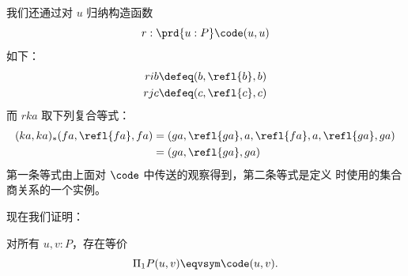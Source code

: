 我们还通过对 $u$ 归纳构造函数
\[ r : \prd{u:P} \code(u,u) \]
如下：
\begin{align*}
  rib &\defeq (b,\refl{b},b)\\
  rjc &\defeq (c,\refl{c},c)
\end{align*}
而 $rka$ 取下列复合等式：
\begin{align*}
  (ka,ka)_* (fa,\refl{fa},fa)
  &= (ga,\refl{ga},a,\refl{fa},a,\refl{ga},ga) \\
  &= (ga,\refl{ga},ga)
\end{align*}
第一条等式由上面对 $\code$ 中传送的观察得到，第二条等式是定义 \code 时使用的集合商关系的一个实例。

现在我们证明：
\begin{thm}\label{thm:naive-van-kampen}
  对所有 $u,v:P$，存在等价
  \[ \Pi_1P(u,v) \eqvsym \code(u,v). \]
\end{thm}
